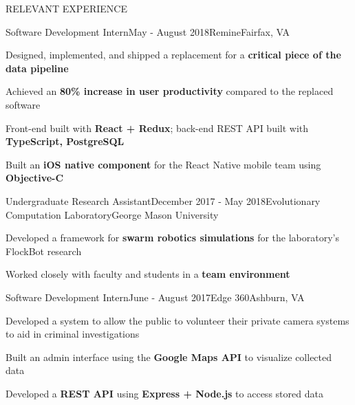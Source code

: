 \documentclass{resume} %
\begin{document}
\begin{rSection}{RELEVANT EXPERIENCE}

\begin{rSubsection}{Software Development Intern}{May - August 2018}{Remine}{Fairfax, VA} 

  \item Designed, implemented, and shipped a replacement for a \textbf{critical piece of the data pipeline}
  \item Achieved an \textbf{80\% increase in user productivity} compared to the replaced software
  \item Front-end built with \textbf{React + Redux}; back-end REST API built with \textbf{TypeScript, PostgreSQL}
  \item Built an \textbf{iOS native component} for the React Native mobile team using \textbf{Objective-C}
  
\end{rSubsection}

\begin{rSubsection}{Undergraduate Research Assistant}{December 2017 - May 2018}{Evolutionary Computation Laboratory}{George Mason University} 

  \item Developed a framework for \textbf{swarm robotics simulations} for the laboratory’s FlockBot research
  \item Worked closely with faculty and students in a \textbf{team environment}
  
\end{rSubsection} 

\begin{rSubsection}{Software Development Intern}{June - August 2017}{Edge 360}{Ashburn, VA} 

  \item Developed a system to allow the public to volunteer their private camera systems to aid in criminal investigations
  \item Built an admin interface using the \textbf{Google Maps API} to visualize collected data
  \item Developed a \textbf{REST API} using \textbf{Express + Node.js} to access stored data
  
\end{rSubsection} 

\end{rSection}

\end{document}
